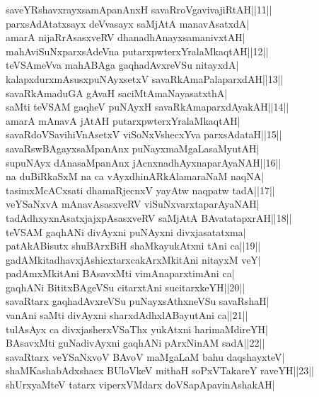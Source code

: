 \documentclass{article}
\begin{document}
saveYRshavxrayxsamApanAnxH savaRroVgavivajiRtAH||11||\\
parxsAdAtatxsayx deVvasayx saMjAtA manavAsatxdA|\\
amarA nijaRrAsasxveRV dhanadhAnayxsamanivxtAH|\\
mahAviSuNxparxsAdeVna putarxpwterxYralaMkaqtAH||12||\\
teVSAmeVva mahABAga gaqhadAvxreVSu nitayxdA|\\
kalapxdurxmAsusxpuNAyxsetxV savaRkAmaPalaparxdAH||13||\\
savaRkAmaduGA gAvaH saciMtAmaNayasatxthA|\\
saMti teVSAM gaqheV puNAyxH savaRkAmaparxdAyakAH||14||\\
amarA mAnavA jAtAH putarxpwterxYralaMkaqtAH|\\
savaRdoVSavihiVnAsetxV viSoNxVshecxYva parxsAdataH||15||\\
savaRswBAgayxsaMpanAnx puNayxmaMgaLasaMyutAH|\\
supuNAyx dAnasaMpanAnx jAcnxnadhAyxnaparAyaNAH||16||\\
na duBiRkaSxM na ca vAyxdhinARkAlamaraNaM naqNA|\\
tasimxMcACxsati dhamaRjecnxV yayAtw naqpatw tadA||17||\\
veYSaNxvA mAnavAsasxveRV viSuNxvarxtaparAyaNAH|\\
tadAdhxyxnAsatxjajxpAsasxveRV saMjAtA BAvatatapxrAH||18||\\
teVSAM gaqhANi divAyxni puNAyxni divxjasatatxma|\\
patAkABisutx shuBArxBiH shaMkayukAtxni tAni ca||19||\\
gadAMkitadhavxjAshicxtarxcakArxMkitAni nitayxM veY|\\
padAmxMkitAni BAsavxMti vimAnaparxtimAni ca|\\
gaqhANi BititxBAgeVSu citarxtAni sucitarxkeYH||20||\\
savaRtarx gaqhadAvxreVSu puNayxsAthxneVSu savaRshaH|\\
vanAni saMti divAyxni sharxdAdhxlABayutAni ca||21||\\
tulAsAyx ca divxjasherxVSaThx yukAtxni harimaMdireYH|\\
BAsavxMti guNadivAyxni gaqhANi pArxNinAM sadA||22||\\
savaRtarx veYSaNxvoV BAvoV maMgaLaM bahu daqshayxteV|\\
shaMKashabAdxshacx BUloVkeV mithaH soPxVTakareY raveYH||23||\\
shUrxyaMteV tatarx viperxVMdarx doVSapApavinAshakAH|\\
\end{document}
